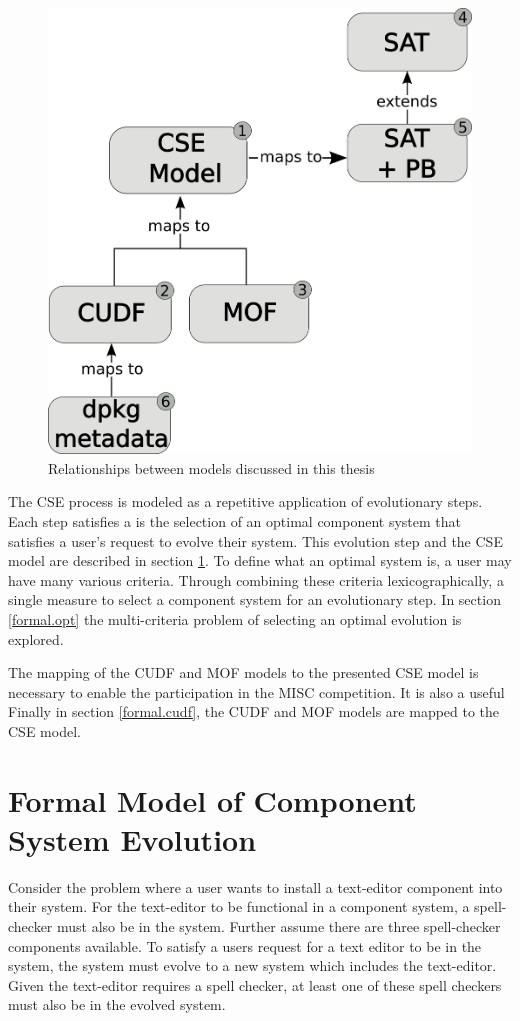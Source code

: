 \begin{figure}[htp]
\begin{center}
  \includegraphics[width = .5\textwidth]{diagrams/models}
  \caption{Relationships between models discussed in this thesis}
  \label{formal.models}
\end{center}
\end{figure}

The CSE process is modeled as a repetitive application of evolutionary steps.
Each step satisfies a is the selection of an optimal component system that satisfies a user's request to evolve their system.
This evolution step and the CSE model are described in section \ref{formal.step}.
To define what an optimal system is, a user may have many various criteria.
Through combining these criteria lexicographically, a single measure to select a component system for an evolutionary step.
In section \ref{formal.opt} the multi-criteria problem of selecting an optimal evolution is explored.

The mapping of the CUDF and MOF models to the presented CSE model is necessary to enable the participation in the MISC competition.
It is also a useful 
Finally in section \ref{formal.cudf}, the CUDF and MOF models are mapped to the CSE model.
 
\section{Formal Model of Component System Evolution}
\label{formal.step}
Consider the problem where a user wants to install a text-editor component into their system.
For the text-editor to be functional in a component system, a spell-checker must also be in the system. 
Further assume there are three spell-checker components available.
To satisfy a users request for a text editor to be in the system, the system must evolve to a new system which includes the text-editor.
Given the text-editor requires a spell checker, at least one of these spell checkers must also be in the evolved system.

